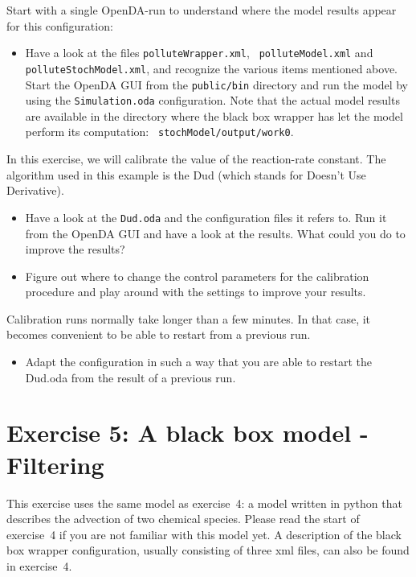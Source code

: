 \documentclass[a4paper,10pt]{article}
\begin{document}
Start with a single OpenDA-run to understand where the model results appear
for this configuration:
\begin{itemize}
 \item Have a look at the files {\tt polluteWrapper.xml}, {\tt
   polluteModel.xml} and {\tt polluteStochModel.xml}, and recognize the various
   items mentioned above. Start the OpenDA GUI from the {\tt public/bin}
   directory and run the model by using the {\tt Simulation.oda} configuration.
   Note that the actual model results are available in the directory where the
   black box wrapper has let the model perform its computation: {\tt
     stochModel/output/work0}.
\end{itemize}

In this exercise, we will calibrate the value of the reaction-rate constant.
The algorithm used in this example is the Dud (which stands for Doesn't Use
Derivative).

\begin{itemize}
\item Have a look at the {\tt Dud.oda} and the configuration files it refers
  to. Run it from the OpenDA GUI and have a look at the results. What could you
  do to improve the results?

\item Figure out where to change the control parameters for the calibration
  procedure and play around with the settings to improve your results.

\end{itemize}

Calibration runs normally take longer than a few minutes. In that case, it
becomes convenient to be able to restart from a previous run.

\begin{itemize}
\item Adapt the configuration in such a way that you are able to restart the
  Dud.oda from the result of a previous run.
\end{itemize}

\section{Exercise 5: A black box model - Filtering}

This exercise uses the same model as exercise~4: a model written in python that
describes the advection of two chemical species. Please read the start of
exercise~4 if you are not familiar with this model yet. A description of the
black box wrapper configuration, usually consisting of three xml files, can
also be found in exercise~4.
\end{document}
